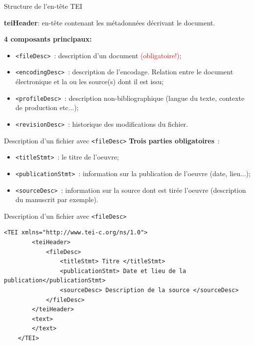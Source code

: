 \begin{frame}{Structure de l'en-tête TEI}
\begin{block}{}
    \textbf{teiHeader}: en-tête contenant les métadonnées décrivant le document.
\end{block}
    \begin{block}{}
        \textbf{4 composants principaux:}
    \begin{itemize}
            \item \texttt{<fileDesc>}~: description d'un document \textcolor{red}{(obligatoire!)};
            \item \texttt{<encodingDesc>}~: description de l'encodage. Relation entre le document électronique et la ou les source(s) dont il est issu;
            \item \texttt{<profileDesc>}~: description non-bibliographique (langue du texte, contexte de production etc...);
            \item \texttt{<revisionDesc>}~: historique des modifications du fichier.
            
    \end{itemize}
    \end{block}
    
\end{frame}

\begin{frame}{Description d'un fichier avec \texttt{<fileDesc>}}
\textbf{Trois parties obligatoires}~:
\begin{itemize}
    \item \texttt{<titleStmt>}~: le titre de l'oeuvre;
    \item \texttt{<publicationStmt>}~: information sur la publication de l'oeuvre (date, lieu...);
    \item \texttt{<sourceDesc>}~: information sur la source dont est tirée l'oeuvre (description du manuscrit par exemple).
\end{itemize}
    
\end{frame}

\begin{frame}[fragile]{Description d'un fichier avec \texttt{<fileDesc>}}
 \begin{lstlisting}[numbers=none]
    <TEI xmlns="http://www.tei-c.org/ns/1.0">
        <teiHeader>
            <fileDesc>
                <titleStmt> Titre </titleStmt>
                <publicationStmt> Date et lieu de la publication</publicationStmt>
                <sourceDesc> Description de la source </sourceDesc>
            </fileDesc>
        </teiHeader>
        <text>
        </text>
    </TEI>
    \end{lstlisting}
    
\end{frame}

